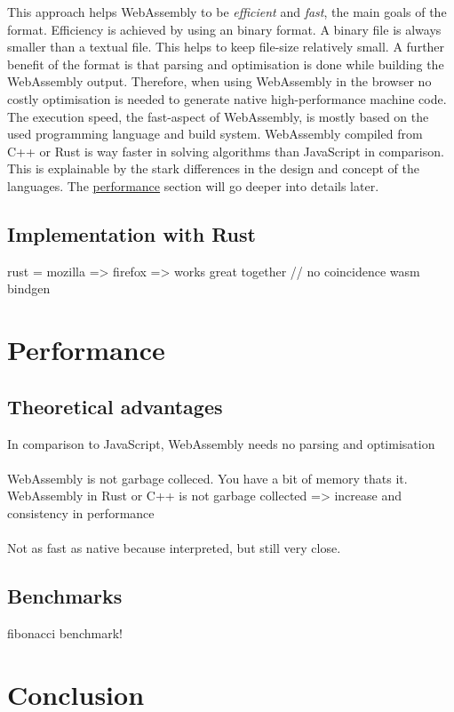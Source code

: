 This approach helps WebAssembly to be \textit{efficient} and \textit{fast}, the main goals of the format. Efficiency is achieved by using an binary format. A binary file is always smaller than a textual file. This helps to keep file-size relatively small. A further benefit of the format is that parsing and optimisation is done while building the WebAssembly output. Therefore, when using WebAssembly in the browser no costly optimisation is needed to generate native high-performance machine code. The execution speed, the fast-aspect of WebAssembly, is mostly based on the used programming language and build system. WebAssembly compiled from C++ or Rust is way faster in solving algorithms than JavaScript in comparison. This is explainable by the stark differences in the design and concept of the languages. The \hyperref[sec:performance]{performance} section will go deeper into details later.


\label{sec:rust}
\subsection{Implementation with Rust}
rust = mozilla => firefox => works great together // no coincidence
wasm bindgen

\label{sec:performance}
\section{Performance}
\subsection{Theoretical advantages}
In comparison to JavaScript, WebAssembly needs no parsing and optimisation 
\\\\
WebAssembly is not garbage colleced. You have a bit of memory thats it.
WebAssembly in Rust or C++ is not garbage collected => increase and consistency in performance
\\\\
Not as fast as native because interpreted, but still very close.
\subsection{Benchmarks}
fibonacci benchmark!

\section{Conclusion}


